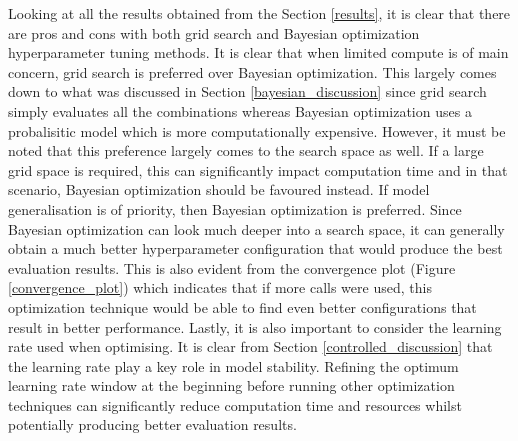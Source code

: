Looking at all the results obtained from the Section \ref{results}, it is clear that there are pros and cons with both grid search and Bayesian optimization hyperparameter tuning methods.
It is clear that when limited compute is of main concern, grid search is preferred over Bayesian optimization. This largely comes down to what was discussed in Section \ref{bayesian_discussion}
since grid search simply evaluates all the combinations whereas Bayesian optimization uses a probalisitic model which is more computationally expensive. However, it must be noted
that this preference largely comes to the search space as well. If a large grid space is required, this can significantly impact computation time and in that scenario, Bayesian
optimization should be favoured instead. If model generalisation is of priority, then Bayesian optimization is preferred. Since Bayesian optimization can look much deeper into
a search space, it can generally obtain a much better hyperparameter configuration that would produce the best evaluation results. This is also evident from the convergence
plot (Figure \ref{convergence_plot}) which indicates that if more calls were used, this optimization technique would be able to find even better configurations that result
in better performance. Lastly, it is also important to consider the learning rate used when optimising. It is clear from Section \ref{controlled_discussion} that the learning
rate play a key role in model stability. Refining the optimum learning rate window at the beginning before running other optimization techniques can significantly reduce
computation time and resources whilst potentially producing better evaluation results.